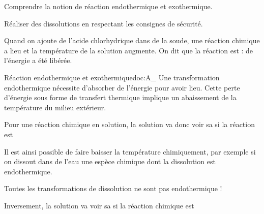 \teteSndChim

\vspace*{-28pt}

\begin{objectifs}
  \item Comprendre la notion de réaction endothermique et exothermique.
  \item Réaliser des dissolutions en respectant les consignes de sécurité.
\end{objectifs}

\begin{contexte}
  Quand on ajoute de l'acide chlorhydrique dans de la soude, une réaction chimique a lieu et la température de la solution augmente.
  On dit que la réaction est  : de l'énergie a été libérée.
  
\end{contexte}


\begin{doc}{Réaction endothermique et exothermique}{doc:A_}
  Une transformation endothermique nécessite d'absorber de l'énergie pour avoir lieu.
  Cette perte d'énergie sous forme de transfert thermique implique un abaissement de la température du milieu extérieur.
  
  \begin{encart}
    Pour une réaction chimique en solution, la solution va donc voir sa  si la réaction est 
  \end{encart}
  
  Il est ainsi possible de faire baisser la température chimiquement, par exemple si on dissout dans de l'eau une espèce chimique dont la dissolution est endothermique.
  
  \attention Toutes les transformations de dissolution ne sont pas endothermique !
  
  \begin{encart}
    Inversement, la solution va voir sa  si la réaction chimique est 
  \end{encart}
\end{doc}

